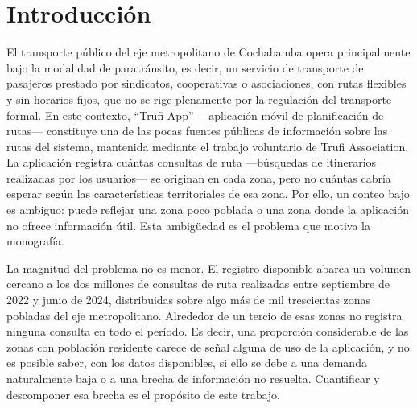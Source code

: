 \chapter{Introducción}
\label{cap:introduccion}

El transporte público del eje metropolitano de Cochabamba opera principalmente bajo la
modalidad de paratránsito, es decir, un servicio de transporte de pasajeros prestado por
sindicatos, cooperativas o asociaciones, con rutas flexibles y sin horarios fijos, que no
se rige plenamente por la regulación del transporte formal. En este contexto, ``Trufi App''
—aplicación móvil de planificación de rutas— constituye una de las pocas fuentes públicas
de información sobre las rutas del sistema, mantenida mediante el trabajo voluntario de
Trufi Association. La aplicación registra cuántas consultas de ruta —búsquedas de
itinerarios realizadas por los usuarios— se originan en cada zona, pero no cuántas cabría
esperar según las características territoriales de esa zona. Por ello, un conteo bajo es
ambiguo: puede reflejar una zona poco poblada o una zona donde la aplicación no ofrece
información útil. Esta ambigüedad es el problema que motiva la monografía.

La magnitud del problema no es menor. El registro disponible abarca un volumen cercano a
los dos millones de consultas de ruta realizadas entre septiembre de 2022 y junio de 2024,
distribuidas sobre algo más de mil trescientas zonas pobladas del eje metropolitano.
Alrededor de un tercio de esas zonas no registra ninguna consulta en todo el período. Es
decir, una proporción considerable de las zonas con población residente carece de señal
alguna de uso de la aplicación, y no es posible saber, con los datos disponibles, si ello
se debe a una demanda naturalmente baja o a una brecha de información no resuelta.
Cuantificar y descomponer esa brecha es el propósito de este trabajo.

